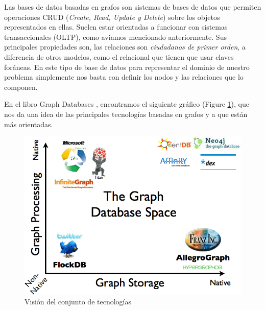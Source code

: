 \documentclass[12pt]{article} %
\begin{document}
\noindent{}

Las bases de datos basadas en grafos son sistemas de bases de datos que permiten operaciones CRUD (\textit{Create, Read, Update y Delete}) sobre los objetos representados en ellas. Suelen estar orientadas a funcionar con sistemas transaccionales (OLTP), como aviamos mencionado anteriormente. Sus principales propiedades son, las relaciones son \textit{ciudadanos de primer orden}, a diferencia de otros modelos, como el relacional que tienen que usar claves foráneas. En este tipo de base de datos para representar el dominio de nuestro problema simplemente nos basta con definir los nodos y las relaciones que lo componen.

En el libro Graph Databases \cite{graphdbbook}, encontramos el siguiente gráfico (Figure \ref{fig:grdb}), que nos da una idea de las principales tecnologías basadas en grafos y a que están más orientadas.

\begin{figure}[ht!]
\center
\includegraphics{add/grdb.png}
\caption{Visión del conjunto de tecnologías}
\label{fig:grdb}
\end{figure}
\end{document}
